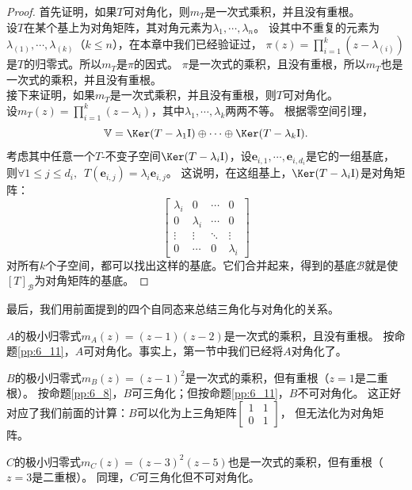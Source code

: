 \documentclass[12pt,UTF8,fontset=none]{ctexbook}
\begin{document}
\begin{proof} %
    首先证明，如果$T$可对角化，则$m_T$是一次式乘积，并且没有重根。\\
    设$T$在某个基上为对角矩阵，其对角元素为$\lambda_1, \cdots, \lambda_n$。
    设其中不重复的元素为$\lambda_{(1)}, \cdots, \lambda_{(k)}$（$k \leqslant n$），在本章中我们已经验证过，
    $ \pi(z) = \prod_{i=1}^k (z - \lambda_{(i)})$是$T$的归零式。所以$m_T$是$\pi$的因式。
    $\pi$是一次式的乘积，且没有重根，所以$m_T$也是一次式的乘积，并且没有重根。\\
    接下来证明，如果$m_T$是一次式乘积，并且没有重根，则$T$可对角化。\\
    设$m_T(z) = \prod_{i=1}^k(z - \lambda_i)$，其中$\lambda_1, \cdots , \lambda_k$两两不等。
    根据零空间引理，
    $$\mathbb{V} = \Ker (T - \lambda_1\mathrm{I}) \oplus \cdots \oplus \Ker (T - \lambda_k\mathrm{I}).$$
    考虑其中任意一个$T$-不变子空间$\Ker (T - \lambda_i\mathrm{I})$，设$\mathbf{e}_{i,1}, \cdots , \mathbf{e}_{i,d_i}$是它的一组基底，
    则$\forall 1 \leqslant j \leqslant d_i, \,\,\, T(\mathbf{e}_{i,j}) = \lambda_i \mathbf{e}_{i,j}$。
    这说明，在这组基上，$\Ker (T - \lambda_i\mathrm{I})$是对角矩阵：
    $$ \begin{bmatrix}
        \lambda_i & 0 & \cdots & 0 \\
        0 & \lambda_i & \cdots & 0 \\
        \vdots & \vdots & \ddots & \vdots \\
        0 & \cdots & 0 & \lambda_i
    \end{bmatrix}$$
    对所有$k$个子空间，都可以找出这样的基底。它们合并起来，得到的基底$\mathcal{B}$就是使$[T]_\mathcal{B}$为对角矩阵的基底。

\end{proof}

最后，我们用前面提到的四个自同态来总结三角化与对角化的关系。

$A$的极小归零式$m_A(z) = (z-1)(z-2)$是一次式的乘积，且没有重根。
按命题\ref{pp:6_11}，$A$可对角化。事实上，第一节中我们已经将$A$对角化了。

$B$的极小归零式$m_B(z) = (z-1)^2$是一次式的乘积，但有重根（$z=1$是二重根）。
按命题\ref{pp:6_8}，$B$可三角化；但按命题\ref{pp:6_11}，$B$不可对角化。
这正好对应了我们前面的计算：$B$可以化为上三角矩阵$\begin{bmatrix} 1 & 1 \\ 0 & 1 \end{bmatrix}$，
但无法化为对角矩阵。

$C$的极小归零式$m_C(z) = (z-3)^2(z-5)$也是一次式的乘积，但有重根（$z=3$是二重根）。
同理，$C$可三角化但不可对角化。
\end{document}
